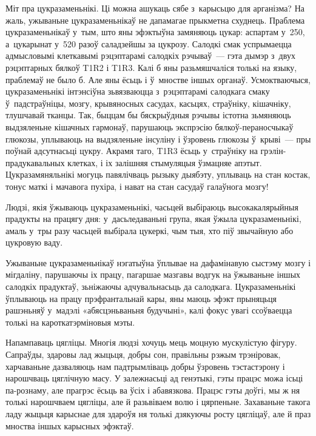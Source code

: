 Міт пра цукразаменьнікі. Ці можна ашукаць сябе з~карысьцю для арганізма? На жаль, ужываньне цукразаменьнікаў не дапамагае прыкметна схуднець. Праблема цукразаменьнікаў у~тым, што яны эфэктыўна замяняюць цукар: аспартам у~250, а~цукарынат у~520 разоў саладзейшы за цукрозу. Салодкі смак успрымаецца адмысловымі клеткавымі рэцэптарамі салодкіх рэчываў~--- гэта дымэр з~двух рэцэптарных бялкоў T1R2 і T1R3. Калі б яны разьмяшчаліся толькі на языку, праблемаў не было б. Але яны ёсьць і ў~мностве іншых органаў. Усмоктваючыся, цукразаменьнікі інтэнсіўна зьвязваюцца з~рэцэптарамі салодкага смаку ў~падстраўніцы, мозгу, крывяносных сасудах, касьцях, страўніку, кішачніку, тлушчавай тканцы. Так, быццам бы бяскрыўдныя рэчывы істотна зьмяняюць выдзяленьне кішачных гармонаў, парушаюць экспрэсію бялкоў-пераносчыкаў глюкозы, уплываюць на выдзяленьне інсуліну і ўзровень глюкозы ў~крыві~--- пры поўнай адсутнасьці цукру. Акрамя таго, T1R3 ёсьць у~страўніку на грэлін-прадукавальных клетках, і іх залішняя стымуляцыя ўзмацняе апэтыт. Цукразамяняльнікі могуць павялічваць рызыку дыябэту, уплываць на стан костак, тонус маткі і мачавога пухіра, і нават на стан сасудаў галаўнога мозгу!

Людзі, якія ўжываюць цукразаменьнікі, часьцей выбіраюць высокакалярыйныя прадукты на працягу дня: у~дасьледаваньні група, якая ўжыла цукразаменьнікі, амаль у~тры разу часьцей выбірала цукеркі, чым тыя, хто піў звычайную або цукровую ваду.

Ужываньне цукразаменьнікаў нэгатыўна ўплывае на дафамінавую сыстэму мозгу і мігдаліну, парушаючы іх працу, пагаршае мазгавы водгук на ўжываньне іншых салодкіх прадуктаў, зьніжаючы адчувальнасьць да салодкага. Цукразаменьнікі ўплываюць на працу прэфрантальнай кары, яны маюць эфэкт прыняцьця рашэньняў у~мадэлі «абясцэньваньня будучыні», калі фокус увагі ссоўваецца толькі на кароткатэрміновыя мэты.

Напампаваць цягліцы. Многія людзі хочуць мець моцную мускулістую фігуру. Сапраўды, здаровы лад жыцьця, добры сон, правільны рэжым трэніровак, харчаваньне дазваляюць нам падтрымліваць добры ўзровень тэстастэрону і нарошчваць цяглічную масу. У залежнасьці ад генэтыкі, гэты працэс можа ісьці па-рознаму, але прагрэс ёсьць ва ўсіх і абавязкова. Працэс гэты доўгі, мы ж ня толькі нарошчваем цягліцы, але й разьвіваем волю і цярпеньне. Захаваньне такога ладу жыцьця карыснае для здароўя ня толькі дзякуючы росту цягліцаў, але й праз мноства іншых карысных эфэктаў.

